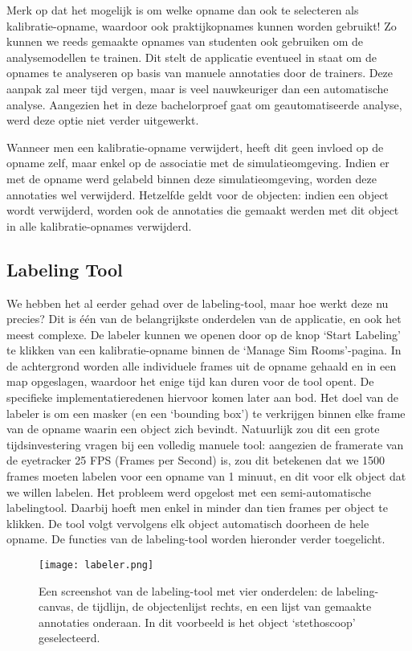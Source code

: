 Merk op dat het mogelijk is om welke opname dan ook te selecteren als kalibratie-opname, waardoor ook praktijkopnames kunnen worden gebruikt!
Zo kunnen we reeds gemaakte opnames van studenten ook gebruiken om de analysemodellen te trainen.
Dit stelt de applicatie eventueel in staat om de opnames te analyseren op basis van manuele annotaties door de trainers.
Deze aanpak zal meer tijd vergen, maar is veel nauwkeuriger dan een automatische analyse. Aangezien het in deze bachelorproef gaat om geautomatiseerde analyse, werd deze optie niet verder uitgewerkt.

Wanneer men een kalibratie-opname verwijdert, heeft dit geen invloed op de opname zelf, maar enkel op de associatie met de simulatieomgeving.
Indien er met de opname werd gelabeld binnen deze simulatieomgeving, worden deze annotaties wel verwijderd. 
Hetzelfde geldt voor de objecten: indien een object wordt verwijderd, worden ook de annotaties die gemaakt werden met dit object in alle kalibratie-opnames verwijderd.

\subsection{Labeling Tool}

We hebben het al eerder gehad over de labeling-tool, maar hoe werkt deze nu precies? Dit is één van de belangrijkste onderdelen van de applicatie, en ook het meest complexe.
De labeler kunnen we openen door op de knop `Start Labeling' te klikken van een kalibratie-opname binnen de `Manage Sim Rooms'-pagina.
In de achtergrond worden alle individuele frames uit de opname gehaald en in een map opgeslagen, waardoor het enige tijd kan duren voor de tool opent. De specifieke implementatieredenen hiervoor komen later aan bod.
Het doel van de labeler is om een masker (en een `bounding box') te verkrijgen binnen elke frame van de opname waarin een object zich bevindt.
Natuurlijk zou dit een grote tijdsinvestering vragen bij een volledig manuele tool: aangezien de framerate van de eyetracker 25 FPS (Frames per Second) is, zou dit betekenen dat we 1500 frames moeten labelen voor een opname van 1 minuut, en dit voor elk object dat we willen labelen.
Het probleem werd opgelost met een semi-automatische labelingtool. Daarbij hoeft men enkel in minder dan tien frames per object te klikken. De tool volgt vervolgens elk object automatisch doorheen de hele opname.
De functies van de labeling-tool worden hieronder verder toegelicht.

\begin{figure}[H]
  \centering
  \texttt{[image: labeler.png]}
  \caption[]{\label{fig:labeler} Een screenshot van de labeling-tool met vier onderdelen: de labeling-canvas, de tijdlijn, de objectenlijst rechts, en een lijst van gemaakte annotaties onderaan. In dit voorbeeld is het object `stethoscoop' geselecteerd. }
\end{figure}

